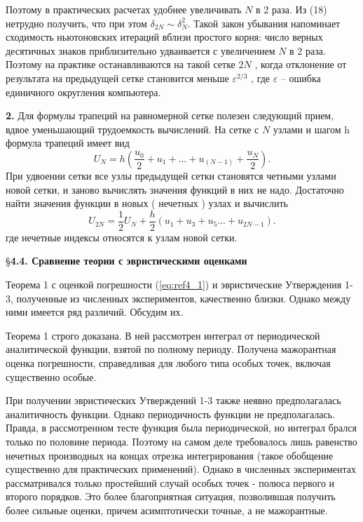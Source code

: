 Поэтому в практических расчетах удобнее увеличивать $N$ в 2 раза. Из (18)
нетрудно получить, что при этом $\delta_{2N} \sim \delta_N^2$. Такой закон убывания напоминает
сходимость ньютоновских итераций вблизи простого корня: число верных
десятичных знаков приблизительно удваивается с увеличением $N$ в 2 раза.
Поэтому на практике останавливаются на такой сетке $2N$ , когда отклонение от
результата на предыдущей сетке становится меньше $\varepsilon^{2/3}$ , где $\varepsilon$ – ошибка
единичного округления компьютера.

\textbf{2.} Для формулы трапеций на равномерной сетке полезен следующий
прием, вдвое уменьшающий трудоемкость вычислений. На сетке с $N$ узлами и
шагом h формула трапеций имеет вид
\begin{equation}
U_N=h(\frac{u_0}{2}+u_1+...+u_(N-1)+\frac{u_N}{2}).
\end{equation}
При удвоении сетки все узлы предыдущей сетки становятся четными узлами
новой сетки, и заново вычислять значения функций в них не надо. Достаточно
найти значения функции в новых ( нечетных ) узлах и вычислить
\begin{equation}
U_{2N}=\frac{1}{2}U_N + \frac{h}{2}(u_1+u_3+u_5...+u_{2N-1}).
\end{equation}
где нечетные индексы относятся к узлам новой сетки.


\S \textbf{4.4. Сравнение теории с эвристическими оценками}

Теорема 1 с оценкой погрешности (\ref{eq:ref4_1}) и эвристические Утверждения 1-3, полученные из численных экспериментов, качественно близки. Однако между ними имеется ряд различий. Обсудим их.

Теорема 1 строго доказана. В ней рассмотрен интеграл от периодической аналитической функции, взятой по полному периоду. Получена мажорантная оценка погрешности, справедливая для любого типа особых точек, включая существенно особые.

При получении эвристических Утверждений 1-3 также неявно предполагалась аналитичность функции. Однако периодичность функции не предполагалась. Правда, в рассмотренном тесте функция была периодической, но интеграл брался только по половине периода. Поэтому на самом деле требовалось лишь равенство нечетных производных на концах отрезка интегрирования (такое обобщение существенно для практических применений). Однако в численных экспериментах рассматривался только простейший случай особых точек - полюса первого и второго порядков. Это более благоприятная ситуация, позволившая получить более сильные оценки, причем асимптотически точные, а не мажорантные.

